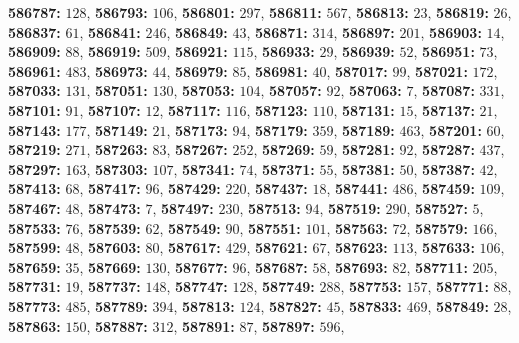 \textsf{\bfseries 586787:} $128$, \textsf{\bfseries 586793:} $106$, \textsf{\bfseries 586801:} $297$, \textsf{\bfseries 586811:} $567$, \textsf{\bfseries 586813:} $23$, \textsf{\bfseries 586819:} $26$, \textsf{\bfseries 586837:} $61$, \textsf{\bfseries 586841:} $246$, \textsf{\bfseries 586849:} $43$, \textsf{\bfseries 586871:} $314$, \textsf{\bfseries 586897:} $201$, \textsf{\bfseries 586903:} $14$, \textsf{\bfseries 586909:} $88$, \textsf{\bfseries 586919:} $509$, \textsf{\bfseries 586921:} $115$, \textsf{\bfseries 586933:} $29$, \textsf{\bfseries 586939:} $52$, \textsf{\bfseries 586951:} $73$, \textsf{\bfseries 586961:} $483$, \textsf{\bfseries 586973:} $44$, \textsf{\bfseries 586979:} $85$, \textsf{\bfseries 586981:} $40$, \textsf{\bfseries 587017:} $99$, \textsf{\bfseries 587021:} $172$, \textsf{\bfseries 587033:} $131$, \textsf{\bfseries 587051:} $130$, \textsf{\bfseries 587053:} $104$, \textsf{\bfseries 587057:} $92$, \textsf{\bfseries 587063:} $7$, \textsf{\bfseries 587087:} $331$, \textsf{\bfseries 587101:} $91$, \textsf{\bfseries 587107:} $12$, \textsf{\bfseries 587117:} $116$, \textsf{\bfseries 587123:} $110$, \textsf{\bfseries 587131:} $15$, \textsf{\bfseries 587137:} $21$, \textsf{\bfseries 587143:} $177$, \textsf{\bfseries 587149:} $21$, \textsf{\bfseries 587173:} $94$, \textsf{\bfseries 587179:} $359$, \textsf{\bfseries 587189:} $463$, \textsf{\bfseries 587201:} $60$, \textsf{\bfseries 587219:} $271$, \textsf{\bfseries 587263:} $83$, \textsf{\bfseries 587267:} $252$, \textsf{\bfseries 587269:} $59$, \textsf{\bfseries 587281:} $92$, \textsf{\bfseries 587287:} $437$, \textsf{\bfseries 587297:} $163$, \textsf{\bfseries 587303:} $107$, \textsf{\bfseries 587341:} $74$, \textsf{\bfseries 587371:} $55$, \textsf{\bfseries 587381:} $50$, \textsf{\bfseries 587387:} $42$, \textsf{\bfseries 587413:} $68$, \textsf{\bfseries 587417:} $96$, \textsf{\bfseries 587429:} $220$, \textsf{\bfseries 587437:} $18$, \textsf{\bfseries 587441:} $486$, \textsf{\bfseries 587459:} $109$, \textsf{\bfseries 587467:} $48$, \textsf{\bfseries 587473:} $7$, \textsf{\bfseries 587497:} $230$, \textsf{\bfseries 587513:} $94$, \textsf{\bfseries 587519:} $290$, \textsf{\bfseries 587527:} $5$, \textsf{\bfseries 587533:} $76$, \textsf{\bfseries 587539:} $62$, \textsf{\bfseries 587549:} $90$, \textsf{\bfseries 587551:} $101$, \textsf{\bfseries 587563:} $72$, \textsf{\bfseries 587579:} $166$, \textsf{\bfseries 587599:} $48$, \textsf{\bfseries 587603:} $80$, \textsf{\bfseries 587617:} $429$, \textsf{\bfseries 587621:} $67$, \textsf{\bfseries 587623:} $113$, \textsf{\bfseries 587633:} $106$, \textsf{\bfseries 587659:} $35$, \textsf{\bfseries 587669:} $130$, \textsf{\bfseries 587677:} $96$, \textsf{\bfseries 587687:} $58$, \textsf{\bfseries 587693:} $82$, \textsf{\bfseries 587711:} $205$, \textsf{\bfseries 587731:} $19$, \textsf{\bfseries 587737:} $148$, \textsf{\bfseries 587747:} $128$, \textsf{\bfseries 587749:} $288$, \textsf{\bfseries 587753:} $157$, \textsf{\bfseries 587771:} $88$, \textsf{\bfseries 587773:} $485$, \textsf{\bfseries 587789:} $394$, \textsf{\bfseries 587813:} $124$, \textsf{\bfseries 587827:} $45$, \textsf{\bfseries 587833:} $469$, \textsf{\bfseries 587849:} $28$, \textsf{\bfseries 587863:} $150$, \textsf{\bfseries 587887:} $312$, \textsf{\bfseries 587891:} $87$, \textsf{\bfseries 587897:} $596$, 
